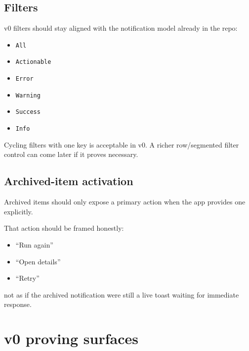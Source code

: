 \subsection{Filters}\label{record-053-filters}

v0 filters should stay aligned with the notification model already in the repo:

\begin{itemize}
\tightlist
\item
  \texttt{A\allowbreak{}l\allowbreak{}l}
\item
  \texttt{A\allowbreak{}c\allowbreak{}t\allowbreak{}i\allowbreak{}o\allowbreak{}n\allowbreak{}a\allowbreak{}b\allowbreak{}l\allowbreak{}e}
\item
  \texttt{E\allowbreak{}r\allowbreak{}r\allowbreak{}o\allowbreak{}r}
\item
  \texttt{W\allowbreak{}a\allowbreak{}r\allowbreak{}n\allowbreak{}i\allowbreak{}n\allowbreak{}g}
\item
  \texttt{S\allowbreak{}u\allowbreak{}c\allowbreak{}c\allowbreak{}e\allowbreak{}s\allowbreak{}s}
\item
  \texttt{I\allowbreak{}n\allowbreak{}f\allowbreak{}o}
\end{itemize}

Cycling filters with one key is acceptable in v0. A richer row/segmented filter control can come later if it proves necessary.

\subsection{Archived-item activation}\label{record-053-archived-item-activation}

Archived items should only expose a primary action when the app provides one explicitly.

That action should be framed honestly:

\begin{itemize}
\tightlist
\item
  ``Run again''
\item
  ``Open details''
\item
  ``Retry''
\end{itemize}

not as if the archived notification were still a live toast waiting for immediate response.

\section{v0 proving surfaces}\label{record-053-v0-proving-surfaces}

